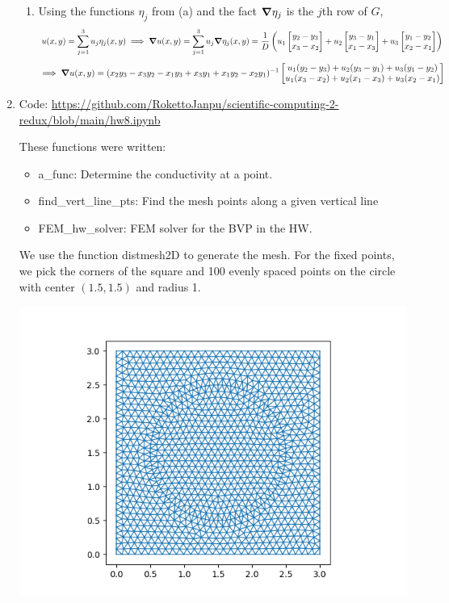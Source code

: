 \documentclass{article}
\newcommand{\br}[1]{\left(#1\right)}
\newcommand{\m}[2][b]{\begin{#1matrix}#2\end{#1matrix}}
\newcommand{\inv}{^{-1}}
\newcommand{\imp}{\implies}
\begin{document}
\begin{enumerate}
\begin{enumerate}
	
	\item Using the functions $\eta_j$ from (a) and the fact $\grad\eta_j$ is the $j$th row of $G$,
	$$u(x,y) = \sum_{j=1}^3 u_j\eta_j(x,y)
	\imp \grad u(x,y) = \sum_{j=1}^3 u_j \grad\eta_j(x,y)
	= \frac{1}{D}\br{u_1\m{y_2-y_3 \\ x_3-x_2} + u_2\m{y_3-y_1 \\ x_1-x_3} + u_3\m{y_1-y_2 \\ x_2-x_1}}$$
	$$\imp \grad u(x,y) = (x_2y_3 - x_3y_2 - x_1y_3 + x_3y_1 + x_1y_2 - x_2y_1)\inv\m{u_1(y_2-y_3)+u_2(y_3-y_1)+u_3(y_1-y_2) \\ u_1(x_3-x_2)+u_2(x_1-x_3)+u_3(x_2-x_1)}$$
	
	
\end{enumerate}


	
\item 

Code: \url{https://github.com/RokettoJanpu/scientific-computing-2-redux/blob/main/hw8.ipynb}

These functions were written:
\begin{itemize}
	\item a\_func: Determine the conductivity at a point.
	\item find\_vert\_line\_pts: Find the mesh points along a given vertical line
	\item FEM\_hw\_solver: FEM solver for the BVP in the HW.
\end{itemize}

We use the function distmesh2D to generate the mesh. For the fixed points, we pick the corners of the square and 100 evenly spaced points on the circle with center $(1.5,1.5)$ and radius 1.
\begin{center}
	\includegraphics[scale=.5]{hw8 mesh}
\end{center}


\end{enumerate}
\end{document}
